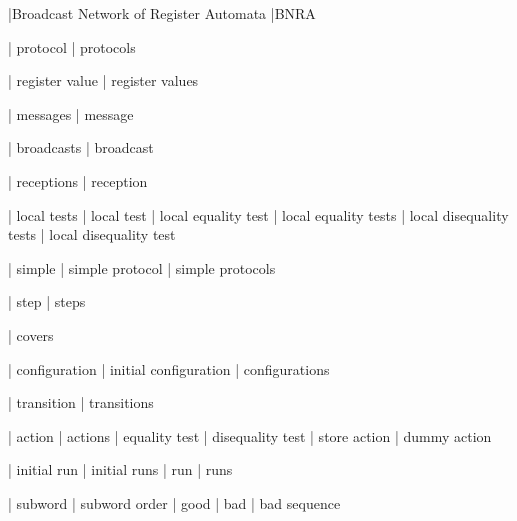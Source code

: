 

|Broadcast Network of Register Automata
|BNRA


| protocol
| protocols

| register value
| register values

| messages
| message

| broadcasts
| broadcast

| receptions
| reception

| local tests
| local test
| local equality test
| local equality tests
| local disequality tests
| local disequality test



| simple
| simple protocol
| simple protocols

| step
| steps

| covers

| configuration
| initial configuration
| configurations

| transition
| transitions

| action
| actions
| equality test
| disequality test
| store action
| dummy action


| initial run
| initial runs
| run
| runs

| subword 
| subword order
| good
| bad
| bad sequence

